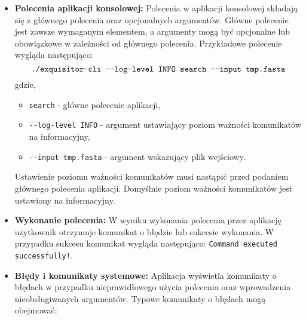                 \begin{itemize}
                
                    \item{
                        \textbf{Polecenia aplikacji konsolowej:}
                        Polecenia w aplikacji konsolowej składają się z głównego polecenia oraz opcjonalnych argumentów. Główne polecenie jest zawsze wymaganym elementem, a argumenty mogą być opcjonalne lub obowiązkowe w zależności od głównego polecenia.
                        Przykładowe polecenie wygląda następująco:
                        \[
                            \texttt{./exquisitor-cli -\phantom{}-log-level INFO search -\phantom{}-input tmp.fasta}
                        \]
                        gdzie,
                        \begin{itemize}
                            \item {
                                \texttt{search} - główne polecenie aplikacji,
                            }
                            \item {
                                \texttt{-\phantom{}-log-level INFO} - argument ustawiający poziom ważności komunikatów na informacyjny,
                            }
                            \item {
                                \texttt{-\phantom{}-input tmp.fasta} - argument wskazujący plik wejściowy.
                            }
                        \end{itemize}
                        Ustawienie poziomu ważności komunikatów musi nastąpić przed podaniem głównego polecenia aplikacji. Domyślnie poziom ważności komunikatów jest ustawiony na informacyjny.
                    }
                    \item {
                        \textbf{Wykonanie polecenia:}
                        W wyniku wykonania polecenia przez aplikację użytkownik otrzymuje komunikat o błędzie lub sukcesie wykonania. W przypadku sukcesu komunikat wygląda następująco:
                        \texttt{Command executed successfully!}.
                    }
                    \item {
                        \textbf{Błędy i komunikaty systemowe:}
                        Aplikacja wyświetla komunikaty o błędach w przypadku nieprawidłowego użycia polecenia oraz wprowadzenia nieobsługiwanych argumentów. Typowe komunikaty o błędach mogą obejmować:
                        \begin{itemize}

\end{itemize}}
\end{itemize}

